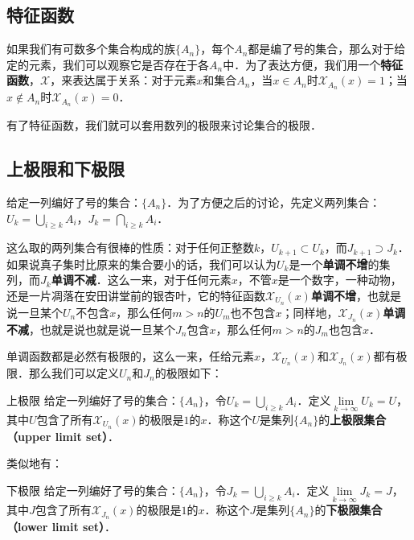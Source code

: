 
\subsection{特征函数}
如果我们有可数多个集合构成的族$\{A_n\}$，每个$A_n$都是编了号的集合，那么对于给定的元素，我们可以观察它是否存在于各$A_n$中．为了表达方便，我们用一个\textbf{特征函数}，$\mathcal{X}$，来表达属于关系：对于元素$x$和集合$A_n$，当$x\in A_n$时$\mathcal{X}_{A_n}(x)=1$；当$x\not\in A_n$时$\mathcal{X}_{A_n}(x)=0$．

有了特征函数，我们就可以套用数列的极限来讨论集合的极限．

\subsection{上极限和下极限}
给定一列编好了号的集合：$\{A_n\}$．为了方便之后的讨论，先定义两列集合：$U_k=\bigcup_{i\ge k}A_i$，$J_k=\bigcap_{i\ge k}A_i$．

这么取的两列集合有很棒的性质：对于任何正整数$k$，$U_{k+1}\subset U_k$，而$J_{k+1}\supset J_k$．如果说真子集时比原来的集合要小的话，我们可以认为$U_k$是一个\textbf{单调不增}的集列，而$J_k$\textbf{单调不减}．这么一来，对于任何元素$x$，不管$x$是一个数字，一种动物，还是一片凋落在安田讲堂前的银杏叶，它的特征函数$\mathcal{X}_{U_n}(x)$\textbf{单调不增}，也就是说一旦某个$U_n$不包含$x$，那么任何$m>n$的$U_m$也不包含$x$；同样地，$\mathcal{X}_{J_n}(x)$\textbf{单调不减}，也就是说也就是说一旦某个$J_n$包含$x$，那么任何$m>n$的$J_m$也包含$x$．

单调函数都是必然有极限的，这么一来，任给元素$x$，$\mathcal{X}_{U_n}(x)$和$\mathcal{X}_{J_n}(x)$都有极限．那么我们可以定义$U_n$和$J_n$的极限如下：

\begin{definition}{上极限}
给定一列编好了号的集合：$\{A_n\}$，令$U_k=\bigcup_{i\ge k}A_i$．定义$\lim\limits_{k\rightarrow\infty} U_k=U$，其中$U$包含了所有$\mathcal{X}_{U_n}(x)$的极限是$1$的$x$．称这个$U$是集列$\{A_n\}$的\textbf{上极限集合（upper limit set）}．
\end{definition}

类似地有：

\begin{definition}{下极限}
给定一列编好了号的集合：$\{A_n\}$，令$J_k=\bigcup_{i\ge k}A_i$．定义$\lim\limits_{k\rightarrow\infty} J_k=J$，其中$J$包含了所有$\mathcal{X}_{J_n}(x)$的极限是$1$的$x$．称这个$J$是集列$\{A_n\}$的\textbf{下极限集合（lower limit set）}．
\end{definition}

